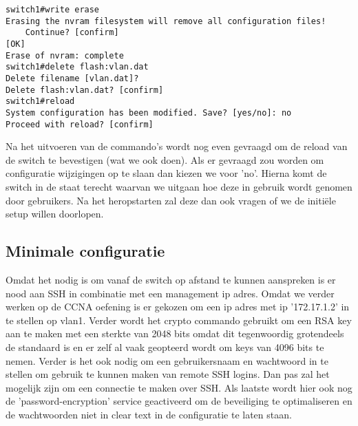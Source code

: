 \begin{center}
\begin{verbatim}
switch1#write erase
Erasing the nvram filesystem will remove all configuration files! 
    Continue? [confirm]
[OK]
Erase of nvram: complete
switch1#delete flash:vlan.dat 
Delete filename [vlan.dat]? 
Delete flash:vlan.dat? [confirm]
switch1#reload
System configuration has been modified. Save? [yes/no]: no
Proceed with reload? [confirm]
\end{verbatim}
\end{center}

Na het uitvoeren van de commando's wordt nog even gevraagd om de reload van de switch te bevestigen (wat we ook doen). Als er gevraagd zou worden om configuratie wijzigingen op te slaan dan kiezen we voor 'no'. Hierna komt de switch in de staat terecht waarvan we uitgaan hoe deze in gebruik wordt genomen door gebruikers. Na het heropstarten zal deze dan ook vragen of we de initiële setup willen doorlopen. 

\subsection{Minimale configuratie}
\label{sec:minimale configuratie}
Omdat het nodig is om vanaf de switch op afstand te kunnen aanspreken is er nood aan SSH in combinatie met een management ip adres. Omdat we verder werken op de CCNA oefening is er gekozen om een ip adres met ip '172.17.1.2' in te stellen op vlan1. Verder wordt het crypto commando gebruikt om een RSA key aan te maken met een sterkte van 2048 bits omdat dit tegenwoordig grotendeels de standaard is en er zelf al vaak geopteerd wordt om keys van 4096 bits te nemen.
Verder is het ook nodig om een gebruikersnaam en wachtwoord in te stellen om gebruik te kunnen maken van remote SSH logins. Dan pas zal het mogelijk zijn om een connectie te maken over SSH. Als laatste wordt hier ook nog de 'password-encryption' service geactiveerd om de beveiliging te optimaliseren en de wachtwoorden niet in clear text in de configuratie te laten staan.


